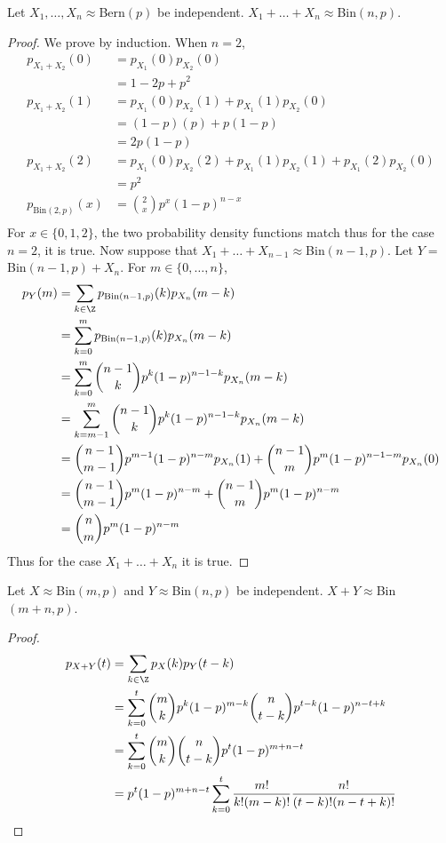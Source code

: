 \documentclass[a4paper]{article}
\begin{document}
\begin{prp}{}{} Let $X_1,\dots,X_n\approx$Bern$(p)$ be independent. $X_1+\dots+X_n\approx$Bin$(n,p)$. 
\end{prp}
\begin{proof} We prove by induction. When $n=2$,
\begin{align*}
p_{X_1+X_2}(0)&=p_{X_1}(0)p_{X_2}(0)\\
&=1-2p+p^2\\
p_{X_1+X_2}(1)&=p_{X_1}(0)p_{X_2}(1)+p_{X_1}(1)p_{X_2}(0)\\
&=(1-p)(p)+p(1-p)\\
&=2p(1-p)\\
p_{X_1+X_2}(2)&=p_{X_1}(0)p_{X_2}(2)+p_{X_1}(1)p_{X_2}(1)+p_{X_1}(2)p_{X_2}(0)\\
&=p^2\\
p_{\text{Bin}(2,p)}(x)&=\binom{2}{x}p^x(1-p)^{n-x}\\
\end{align*} For $x\in\{0,1,2\}$, the two probability density functions match thus for the case $n=2$, it is true. Now suppose that $X_1+\dots+X_{n-1}\approx$Bin$(n-1,p)$. Let $Y=$Bin$(n-1,p)+X_n$. For $m\in\{0,\dots,n\}$,
\begin{align*}
p_Y(m)&=\sum_{k\in\Z}p_{\text{Bin}(n-1,p)}(k)p_{X_n}(m-k)\\
&=\sum_{k=0}^mp_{\text{Bin}(n-1,p)}(k)p_{X_n}(m-k)\\
&=\sum_{k=0}^m\binom{n-1}{k}p^k(1-p)^{n-1-k}p_{X_n}(m-k)\\
&=\sum_{k=m-1}^m\binom{n-1}{k}p^k(1-p)^{n-1-k}p_{X_n}(m-k)\\
&=\binom{n-1}{m-1}p^{m-1}(1-p)^{n-m}p_{X_n}(1)+\binom{n-1}{m}p^m(1-p)^{n-1-m}p_{X_n}(0)\\
&=\binom{n-1}{m-1}p^{m}(1-p)^{n-m}+\binom{n-1}{m}p^m(1-p)^{n-m}\\
&=\binom{n}{m}p^{m}(1-p)^{n-m}
\end{align*} Thus for the case $X_1+\dots+X_n$ it is true. 
\end{proof}

\begin{prp}{}{} Let $X\approx$Bin$(m,p)$ and $Y\approx$Bin$(n,p)$ be independent. $X+Y\approx$Bin$(m+n,p)$. 
\end{prp}
\begin{proof}
\begin{align*}
p_{X+Y}(t)&=\sum_{k\in\Z}p_X(k)p_Y(t-k)\\
&=\sum_{k=0}^t\binom{m}{k}p^k(1-p)^{m-k}\binom{n}{t-k}p^{t-k}(1-p)^{n-t+k}\\
&=\sum_{k=0}^t\binom{m}{k}\binom{n}{t-k}p^t(1-p)^{m+n-t}\\
&=p^t(1-p)^{m+n-t}\sum_{k=0}^t\frac{m!}{k!(m-k)!}\frac{n!}{(t-k)!(n-t+k)!}\\
\end{align*}
\end{proof}
\end{document}
